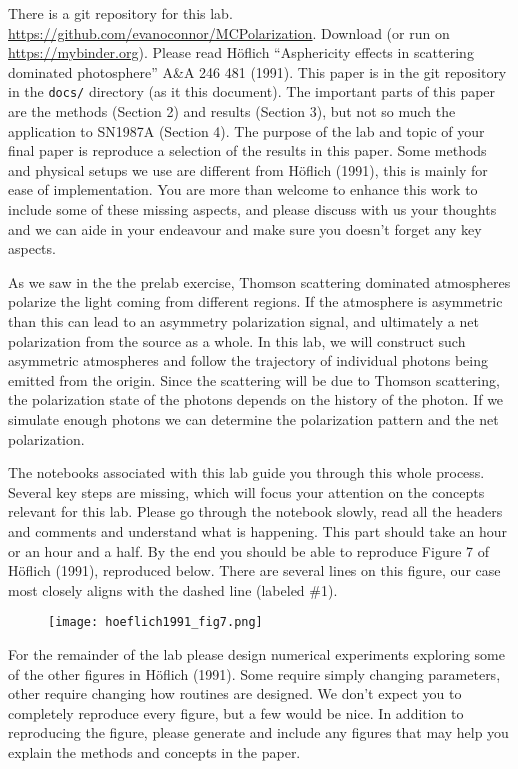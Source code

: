\documentclass[12pt]{amsart}
\begin{document}
There is a git repository for this lab.
\url{https://github.com/evanoconnor/MCPolarization}. Download (or run
on \url{https://mybinder.org}).  Please read H\"oflich ``Asphericity
effects in scattering dominated photosphere'' A\&A 246 481
(1991). This paper is in the git repository in the {\tt {docs/}}
directory (as it this document).  The important parts of this paper
are the methods (Section 2) and results (Section 3), but not so much
the application to SN1987A (Section 4).  The purpose of the lab and
topic of your final paper is reproduce a selection of the results in
this paper.  Some methods and physical setups we use are different
from H\"oflich (1991), this is mainly for ease of implementation.  You
are more than welcome to enhance this work to include some of these
missing aspects, and please discuss with us your thoughts and we can
aide in your endeavour and make sure you doesn't forget any key
aspects. \newline

As we saw in the the prelab exercise, Thomson scattering
dominated atmospheres polarize the light coming from different
regions.  If the atmosphere is asymmetric than this can lead to an
asymmetry polarization signal, and ultimately a net polarization from
the source as a whole.  In this lab, we will construct such asymmetric
atmospheres and follow the trajectory of individual photons being
emitted from the origin.  Since the scattering will be due to Thomson
scattering, the polarization state of the photons depends on the
history of the photon.  If we simulate enough photons we can determine
the polarization pattern and the net polarization. \newline

The notebooks associated with this lab guide you through this whole
process.  Several key steps are missing, which will focus your
attention on the concepts relevant for this lab.  Please go through
the notebook slowly, read all the headers and comments and understand
what is happening. This part should take an hour or an hour and a
half.  By the end you should be able to reproduce Figure 7 of
H\"oflich (1991), reproduced below.  There are several lines on this
figure, our case most closely aligns with the dashed line (labeled \#1). \newline

\begin{figure}[h]
  \texttt{[image: hoeflich1991\_fig7.png]}
\end{figure}

For the remainder of the lab please design numerical experiments
exploring some of the other figures in H\"oflich (1991).  Some require
simply changing parameters, other require changing how routines are
designed.  We don't expect you to completely reproduce every figure,
but a few would be nice.  In addition to reproducing the figure,
please generate and include any figures that may help you explain the
methods and concepts in the paper.
\end{document}
